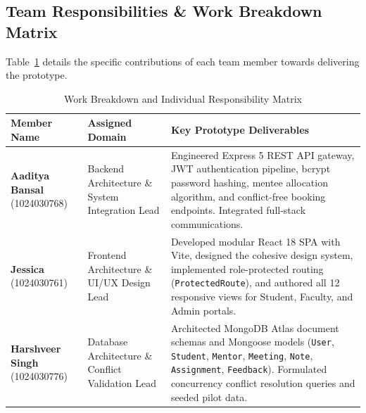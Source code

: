 \documentclass[11pt,a4paper]{article}
\begin{document}
\subsection{Team Responsibilities \& Work Breakdown Matrix}
Table~\ref{tab:wbs} details the specific contributions of each team member towards delivering the prototype.

\begin{table}[H]
\centering
\small
\begin{tabularx}{\textwidth}{lp{3.5cm}X}
\toprule
\textbf{Member Name} & \textbf{Assigned Domain} & \textbf{Key Prototype Deliverables} \\
\midrule
\textbf{Aaditya Bansal} \newline (1024030768) & Backend Architecture \& System Integration Lead & Engineered Express 5 REST API gateway, JWT authentication pipeline, bcrypt password hashing, mentee allocation algorithm, and conflict-free booking endpoints. Integrated full-stack communications. \\
\midrule
\textbf{Jessica} \newline (1024030761) & Frontend Architecture \& UI/UX Design Lead & Developed modular React 18 SPA with Vite, designed the cohesive design system, implemented role-protected routing (\texttt{ProtectedRoute}), and authored all 12 responsive views for Student, Faculty, and Admin portals. \\
\midrule
\textbf{Harshveer Singh} \newline (1024030776) & Database Architecture \& Conflict Validation Lead & Architected MongoDB Atlas document schemas and Mongoose models (\texttt{User}, \texttt{Student}, \texttt{Mentor}, \texttt{Meeting}, \texttt{Note}, \texttt{Assignment}, \texttt{Feedback}). Formulated concurrency conflict resolution queries and seeded pilot data. \\
\bottomrule
\end{tabularx}
\caption{Work Breakdown and Individual Responsibility Matrix}
\label{tab:wbs}
\end{table}

\end{document}
